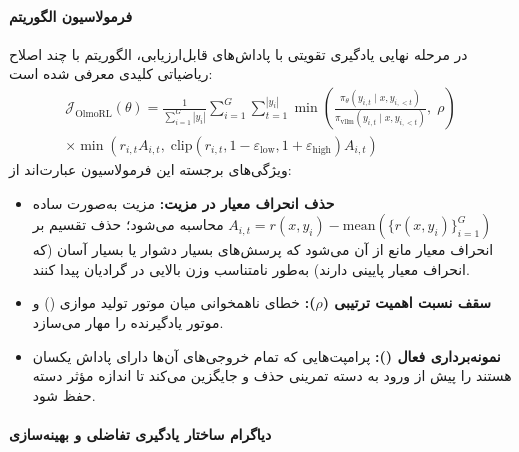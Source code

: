 \paragraph*{فرمولاسیون الگوریتم }
در مرحله نهایی یادگیری تقویتی با پاداش‌های قابل‌ارزیابی، الگوریتم  با چند اصلاح ریاضیاتی کلیدی معرفی شده است:
\begin{multline}
    \mathcal{J}_{\text{OlmoRL}}(\theta) = \frac{1}{\sum_{i=1}^G |y_i|} \sum_{i=1}^G \sum_{t=1}^{|y_i|} \min\left( \frac{\pi_\theta(y_{i,t} \mid x, y_{i,<t})}{\pi_{\text{vllm}}(y_{i,t} \mid x, y_{i,<t})}, \; \rho \right) \\
    \times \min\left( r_{i,t} A_{i,t}, \; \text{clip}(r_{i,t}, 1-\varepsilon_{\text{low}}, 1+\varepsilon_{\text{high}}) A_{i,t} \right)
\end{multline}
ویژگی‌های برجسته این فرمولاسیون عبارت‌اند از:
\begin{itemize}
    \item \textbf{حذف انحراف معیار در مزیت:} مزیت به‌صورت ساده $A_{i,t} = r(x, y_i) - \text{mean}(\{r(x, y_i)\}_{i=1}^G)$ محاسبه می‌شود؛ حذف تقسیم بر انحراف معیار مانع از آن می‌شود که پرسش‌های بسیار دشوار یا بسیار آسان (که انحراف معیار پایینی دارند) به‌طور نامتناسب وزن بالایی در گرادیان پیدا کنند.
    \item \textbf{سقف نسبت اهمیت ترتیبی ($\rho$):} خطای ناهمخوانی میان موتور تولید موازی () و موتور یادگیرنده را مهار می‌سازد.
    \item \textbf{نمونه‌برداری فعال ():} پرامپت‌هایی که تمام خروجی‌های آن‌ها دارای پاداش یکسان هستند را پیش از ورود به دسته تمرینی حذف و جایگزین می‌کند تا اندازه مؤثر دسته حفظ شود.
\end{itemize}

\paragraph*{دیاگرام ساختار یادگیری تفاضلی و بهینه‌سازی }
\begin{center}
\end{center}